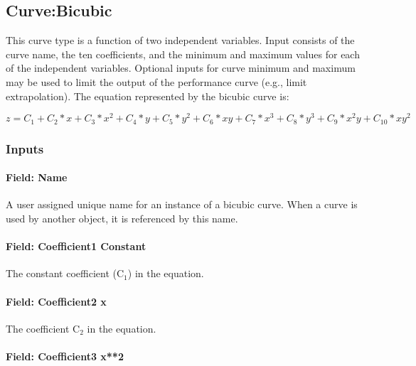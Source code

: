 \subsection{Curve:Bicubic}\label{curvebicubic}

This curve type is a function of two independent variables. Input consists of the curve name, the ten coefficients, and the minimum and maximum values for each of the independent variables. Optional inputs for curve minimum and maximum may be used to limit the output of the performance curve (e.g., limit extrapolation). The equation represented by the bicubic curve is:

\begin{equation}
z = {C_1} + {C_2}*x + {C_3}*{x^2} + {C_4}*y + {C_5}*{y^2} + {C_6}*xy + {C_7}*{x^3} + {C_8}*{y^3} + {C_9}*{x^2}y + {C_{10}}*x{y^2}
\end{equation}

\subsubsection{Inputs}\label{inputs-6-016}

\paragraph{Field: Name}\label{field-name-6-013}

A user assigned unique name for an instance of a bicubic curve. When a curve is used by another object, it is referenced by this name.

\paragraph{Field: Coefficient1 Constant}\label{field-coefficient1-constant-6}

The constant coefficient (C\(_{1}\)) in the equation.

\paragraph{Field: Coefficient2 x}\label{field-coefficient2-x-4}

The coefficient C\(_{2}\) in the equation.

\paragraph{Field: Coefficient3 x**2}\label{field-coefficient3-x2-3}

